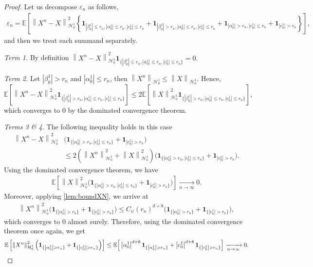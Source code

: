 \documentclass[11pt,a4paper,reqno]{amsart}
\numberwithin{equation}{section}
\theoremstyle{plain}
\theoremstyle{definition}
\def\e{{\varepsilon}}
\newcommand{\E}{\mathbb{E}}
\newcommand{\cH}{\mathcal{H}}
\newcommand{\norm}[1]{\left\|#1 \right\|} %
\newcommand{\abs}[1]{\left|#1\right|} %
\begin{document}
\begin{proof}
Let us decompose $\e_n$ as follows, 
\begin{align*}
\e_n = \E \left[ \norm{X^n - X}_{\cH_0^1}^2 \left\{ \boldsymbol{1}_{\abs{\beta_0^1} \le r_n, \abs{\alpha_0^1} \le r_n, \abs{c_0^1}\le r_n} 
    + \boldsymbol{1}_{\abs{\beta_0^1} > r_n, \abs{\alpha_0^1} \le r_n,\abs{c_0^1}\le r_n } 
    + \boldsymbol{1}_{\abs{\alpha_0^1} > r_n, \abs{c_0^1}\le r_n}
    + \boldsymbol{1}_{ \abs{c_0^1}> r_n} \right\} \right],
\end{align*}
and then we treat each summand separately.

\noindent\textit{Term 1.} 
By definition $\norm{X^n - X}_{\cH_0^1}^2 \boldsymbol{1}_{\{ \abs{\beta_0^1} \le r_n, \abs{\alpha_0^1} \le r_n , \abs{c_0^1}\le r_n \}} = 0.$

\noindent\textit{Term 2.}
Let $\abs{\beta_0^1} > r_n$ and $\abs{\alpha_0^1} \le r_n$, then $\norm{X^n}_{\cH_0^1} \le \norm{X}_{\cH_0^1}$. 
Hence,
\[
\E \left[ \norm{X^n - X}_{\cH_0^1}^2 \boldsymbol{1}_{\{ \abs{\beta_0^1} > r_n, \abs{\alpha_0^1} \le r_n,\abs{c_0^1}\le r_n  \}} \right]\le 2\E \left[ \norm{X}_{\cH_0^1}^2 \boldsymbol{1}_{\{ \abs{\beta_0^1} > r_n, \abs{\alpha_0^1} \le r_n ,\abs{c_0^1}\le r_n \}} \right],
\]
which converges to $0$ by the dominated convergence theorem.

\noindent\textit{Terms 3 \& 4.}
The following inequality holds in this case
\begin{align*}
\norm{X^n - X}_{\cH_0^1}^2 & \Big(\boldsymbol{1}_{\{ \abs{\alpha_0^1} > r_n,\abs{c_0^1}\le r_n  \}}+\boldsymbol{1}_{\abs{c_0^1}> r_n}\Big) \\
    &\le  2 \left( \norm{X^n}_{\cH_0^1}^2 + \norm{X}_{\cH_0^1}^2 \right) \Big(\boldsymbol{1}_{\{ \abs{\alpha_0^1} > r_n,\abs{c_0^1}\le r_n  \}}+\boldsymbol{1}_{\abs{c_0^1}> r_n}\Big).
\end{align*}
Using the dominated convergence theorem, we have
\begin{align*}
    \E \left[ \norm{X}_{\cH_0^1}^2 \Big(\boldsymbol{1}_{\{ \abs{\alpha_0^1} > r_n,\abs{c_0^1}\le r_n  \}}+\boldsymbol{1}_{ \abs{c_0^1}> r_n\}}\Big) \right] \xrightarrow[n\to\infty]{} 0.
\end{align*}
Moreover, applying \cref{lem:boundXN}, we arrive at
\begin{align*}
    \norm{X^n}_{\cH_0^1}^2 \Big(\boldsymbol{1}_{\{ \abs{\alpha_0^1} > r_n\}}+\boldsymbol{1}_{\{ \abs{c_0^1} > r_n\}}\Big)
     \le  C_\psi (r_n)^{d+8}\Big(\boldsymbol{1}_{\{ \abs{\alpha_0^1} > r_n\}}+\boldsymbol{1}_{\{ \abs{c_0^1} > r_n\}}\Big) ,
\end{align*}
which converges to $0$ almost surely. 
Therefore, using the dominated convergence theorem once again, we get 
\[
\E \left[ \norm{X^n}_{\cH_0^1}^2 \Big(\boldsymbol{1}_{\{ \abs{\alpha_0^1} > r_n\}}+\boldsymbol{1}_{\{ \abs{c_0^1} > r_n\}}\Big) \right]
    \le \E\Big[\abs{\alpha_0^1}^{d+8}\boldsymbol{1}_{\{ \abs{\alpha_0^1} > r_n\}}+\abs{c_0^1}^{d+8}\boldsymbol{1}_{\{ \abs{c_0^1} > r_n\}}\Big] 
    \xrightarrow[n\to\infty]{} 0. \qedhere
\]
\end{proof}
\end{document}
